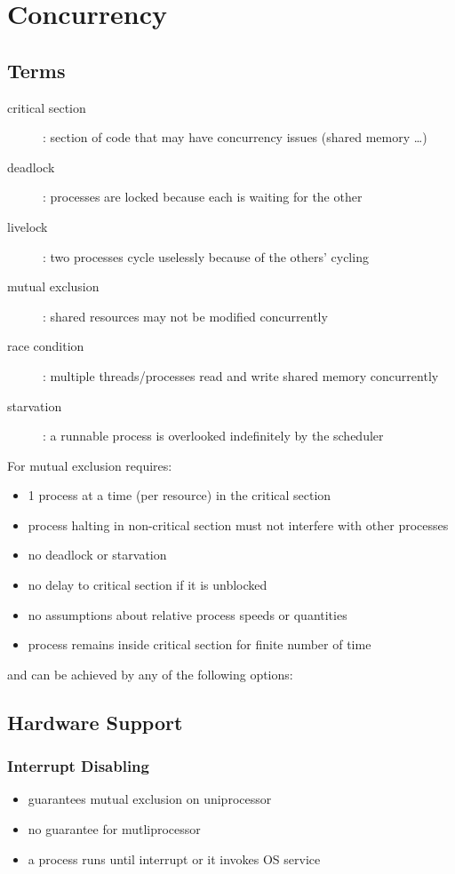 \documentclass[]{article}
\theoremstyle{definition}
\begin{document}
	\section{Concurrency}
		\subsection{Terms}
			\begin{description}
				\item[critical section]: section of code that may have concurrency issues (shared memory \ldots)
				\item[deadlock]: processes are locked because each is waiting for the other
				\item[livelock]: two processes cycle uselessly because of the others' cycling
				\item[mutual exclusion]: shared resources may not be modified concurrently
				\item[race condition]: multiple threads/processes read and write shared memory concurrently
				\item[starvation]: a runnable process is overlooked indefinitely by the scheduler
			\end{description}
			For mutual exclusion requires:
			\begin{itemize}
				\item 1 process at a time (per resource) in the critical section
				\item process halting in non-critical section must not interfere with other processes
				\item no deadlock or starvation
				\item no delay to critical section if it is unblocked
				\item no assumptions about relative process speeds or quantities
				\item process remains inside critical section for finite number of time
			\end{itemize}
			and can be achieved by any of the following options:
		\subsection{Hardware Support}
			\subsubsection{Interrupt Disabling}
				\begin{itemize}
					\item guarantees mutual exclusion on uniprocessor
					\item no guarantee for mutliprocessor
					\item a process runs until interrupt or it invokes OS service
				\end{itemize}
\end{document}

